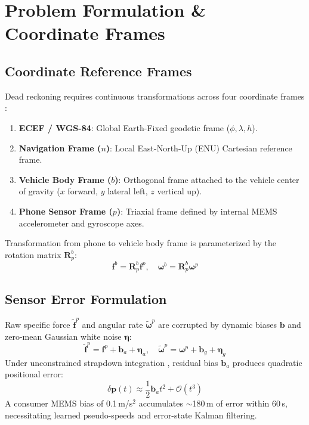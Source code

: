 \documentclass[conference]{IEEEtran}
\begin{document}
\section{Problem Formulation \& Coordinate Frames}

\subsection{Coordinate Reference Frames}
Dead reckoning requires continuous transformations across four coordinate frames \cite{sola2017}:
\begin{enumerate}
\item \textbf{ECEF / WGS-84}: Global Earth-Fixed geodetic frame ($\phi, \lambda, h$).
\item \textbf{Navigation Frame ($n$)}: Local East-North-Up (ENU) Cartesian reference frame.
\item \textbf{Vehicle Body Frame ($b$)}: Orthogonal frame attached to the vehicle center of gravity ($x$ forward, $y$ lateral left, $z$ vertical up).
\item \textbf{Phone Sensor Frame ($p$)}: Triaxial frame defined by internal MEMS accelerometer and gyroscope axes.
\end{enumerate}
Transformation from phone to vehicle body frame is parameterized by the rotation matrix $\mathbf{R}_p^b$:
\begin{equation}
\mathbf{f}^b = \mathbf{R}_p^b \mathbf{f}^p, \quad \boldsymbol{\omega}^b = \mathbf{R}_p^b \boldsymbol{\omega}^p
\end{equation}

\subsection{Sensor Error Formulation}
Raw specific force $\tilde{\mathbf{f}}^p$ and angular rate $\tilde{\boldsymbol{\omega}}^p$ are corrupted by dynamic biases $\mathbf{b}$ and zero-mean Gaussian white noise $\boldsymbol{\eta}$:
\begin{equation}
\tilde{\mathbf{f}}^p = \mathbf{f}^p + \mathbf{b}_a + \boldsymbol{\eta}_a, \quad \tilde{\boldsymbol{\omega}}^p = \boldsymbol{\omega}^p + \mathbf{b}_g + \boldsymbol{\eta}_g
\end{equation}
Under unconstrained strapdown integration \cite{brossard2020, dissanayake2001}, residual bias $\mathbf{b}_a$ produces quadratic positional error:
\begin{equation}
\delta \mathbf{p}(t) \approx \frac{1}{2}\mathbf{b}_a t^2 + \mathcal{O}(t^3)
\end{equation}
A consumer MEMS bias of 0.1\,m/s$^2$ accumulates $\sim$180\,m of error within 60\,s, necessitating learned pseudo-speeds and error-state Kalman filtering.
\end{document}
